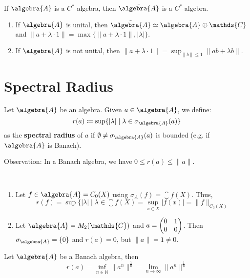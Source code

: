 \documentclass[a4paper]{article}
\begin{document}
\begin{remark}
	If $\algebra{A}$ is a $C^*$-algebra, then $\tilde{\algebra{A}}$ is a $C^*$-algebra.
	\begin{enumerate}
		\item If $ \algebra{A}$ is unital, then $\tilde{\algebra{A}} \simeq \algebra{A} \oplus \mathds{C}$ and $\|a + \lambda \cdot 1\| = \max\{\|a + \lambda \cdot 1\|, |\lambda|\}$.
		\item If $\algebra{A}$ is not unital, then $\|a + \lambda \cdot 1\| = \sup_{\|b\| \leq 1} \|ab + \lambda b\|$.
	\end{enumerate}
\end{remark}

\section{Spectral Radius}

\begin{definition}
	Let $\algebra{A}$ be an algebra. Given $a \in \algebra{A}$, we define:
	\begin{equation*}
		r(a) \coloneq \sup \{ |\lambda| \mid \lambda \in \sigma_\algebra{A}(a) \}
	\end{equation*}
	as the \textbf{spectral radius} of $a$ if $\emptyset \neq \sigma_\algebra{A}(a)$ is bounded (e.g. if $\algebra{A}$ is Banach).
\end{definition}

Observation: In a Banach algebra, we have $0 \leq r(a) \leq \|a\|$.

\begin{example}~
	\begin{enumerate}
		\item Let $f \in \algebra{A} = C_0(X)$ using $\sigma_A(f) = \closure{f(X)}$. Thus,
		      \begin{equation*}
			      r(f) = \sup \{ |\lambda| \mid \lambda \in \closure{f(X)} = \sup_{x \in X} |f(x)| = \|f\|_{C_0(X)}
		      \end{equation*}
		\item Let $\algebra{A} = M_2(\mathds{C})$ and $a = \left(\begin{matrix}0 & 1 \\ 0 & 0\end{matrix}\right)$. Then $\sigma_\algebra{A} = \{0\}$ and $r(a) = 0$, but $\|a\| = 1 \neq 0$.
	\end{enumerate}
\end{example}

\begin{theorem}
	Let $\algebra{A}$ be a Banach algebra, then
	\begin{equation*}
		r(a) = \inf_{n \in \mathds{N}} \|a^n\|^{\frac{1}{n}} = \lim_{n \to \infty} \|a^n\|^{\frac{1}{n}}
	\end{equation*}
\end{theorem}
\end{document}
